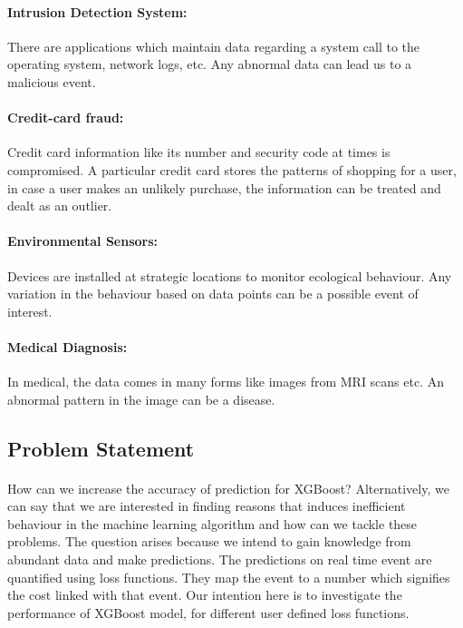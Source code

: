 \documentclass[runningheads]{llncs}
\begin{document}
\paragraph{Intrusion Detection System: }There are applications which maintain data regarding a system call to the operating system, network logs, etc. Any abnormal data can lead us to a malicious event.
\paragraph{Credit-card fraud:} Credit card information like its number and security code at times is compromised. A particular credit card stores the patterns of shopping for a user, in case a user makes an unlikely purchase, the information can be treated and dealt as an outlier.
\paragraph{Environmental Sensors:} Devices are installed at strategic locations to monitor ecological behaviour. Any variation in the behaviour based on data points can be a possible event of interest.
\paragraph{Medical Diagnosis:} In medical, the data comes in many forms like images from MRI scans etc. An abnormal pattern in the image can be a disease.

\subsection{Problem Statement}
\paragraph{}How can we increase the accuracy of prediction for XGBoost? Alternatively, we can say that we are interested in finding reasons that induces inefficient behaviour in the machine learning algorithm and how can we tackle these problems. The question arises because we intend to gain knowledge from abundant data and make predictions. The predictions on real time event are quantified using loss functions. They map the event to a number which signifies the cost linked with that event. Our intention here is to investigate the performance of XGBoost model, for different user defined loss functions.
\end{document}
